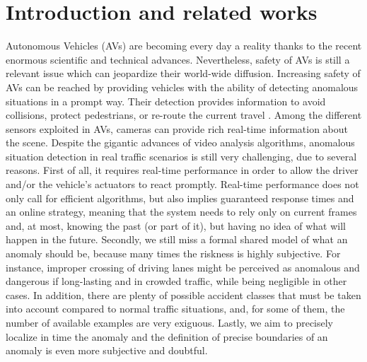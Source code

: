 \section{Introduction and related works}

Autonomous Vehicles (AVs) are becoming every day a reality thanks to the recent enormous scientific and technical advances.
Nevertheless, safety of AVs is still a relevant issue which can jeopardize their world-wide diffusion.
Increasing safety of AVs can be reached by providing vehicles with the ability of detecting anomalous situations in a prompt way.
Their detection provides information to avoid collisions, protect pedestrians, or re-route the current travel \cite{4298901}.
Among the different sensors exploited in AVs, cameras can provide rich real-time information about the scene.
Despite the gigantic advances of video analysis algorithms, anomalous situation detection in real traffic scenarios is still very challenging, due to several reasons.
First of all, it requires real-time performance in order to allow the driver and/or the vehicle's actuators to react promptly.
Real-time performance does not only call for efficient algorithms, but also implies guaranteed response times and an online strategy, meaning that the system needs to rely only on current frames and, at most, knowing the past (or part of it), but having no idea of what will happen in the future.
Secondly, we still miss a formal shared model of what an anomaly should be, because many times the riskness is highly subjective.
For instance, improper crossing of driving lanes might be perceived as anomalous and dangerous if long-lasting and in crowded traffic, while being negligible in other cases.
In addition, there are plenty of possible accident classes that must be taken into account compared to normal traffic situations, and, for some of them, the number of available examples are very exiguous.
Lastly, we aim to precisely localize in time the anomaly and the definition of precise boundaries of an anomaly is even more subjective and doubtful.
